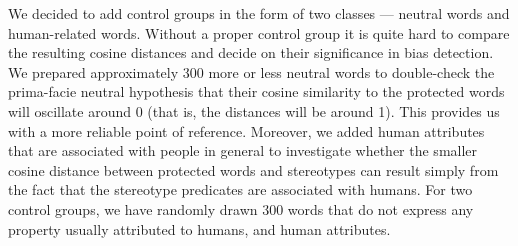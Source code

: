 \documentclass[12pt,]{book}
\newenvironment{Shaded}{\begin{snugshade}}{\end{snugshade}}
\newcommand{\KeywordTok}[1]{\textcolor[rgb]{0.13,0.29,0.53}{\textbf{#1}}}
\newcommand{\DataTypeTok}[1]{\textcolor[rgb]{0.13,0.29,0.53}{#1}}
\newcommand{\DecValTok}[1]{\textcolor[rgb]{0.00,0.00,0.81}{#1}}
\newcommand{\StringTok}[1]{\textcolor[rgb]{0.31,0.60,0.02}{#1}}
\newcommand{\OtherTok}[1]{\textcolor[rgb]{0.56,0.35,0.01}{#1}}
\newcommand{\OperatorTok}[1]{\textcolor[rgb]{0.81,0.36,0.00}{\textbf{#1}}}
\newcommand{\NormalTok}[1]{#1}
\begin{document}
We decided to add control groups in the form of two classes --- neutral
words and human-related words. Without a proper control group it is
quite hard to compare the resulting cosine distances and decide on their
significance in bias detection. We prepared approximately
300 more or less neutral words to double-check the
prima-facie neutral hypothesis that their cosine similarity to the
protected words will oscillate around 0 (that is, the distances will be
around 1). This provides us with a more reliable point of reference.
Moreover, we added human attributes that are associated with people in
general to investigate whether the smaller cosine distance between
protected words and stereotypes can result simply from the fact that the
stereotype predicates are associated with humans. For two control
groups, we have randomly drawn 300 words that do not express any
property usually attributed to humans, and human attributes.

\vspace{1mm} \footnotesize

\begin{Shaded}
\end{Shaded}
\end{document}
